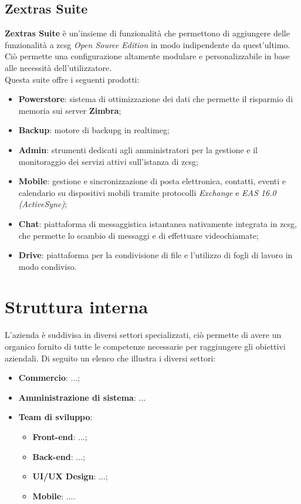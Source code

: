     \subsection{Zextras Suite}
        \textbf{Zextras Suite} è un'insieme di funzionalità che permettono di aggiungere delle funzionalità a \gls{zcsg} \textit{Open Source Edition} in modo indipendente da quest'ultimo. Ciò permette una configurazione altamente modulare e personalizzabile in base alle necessità dell'utilizzatore. \\
        Questa suite offre i seguenti prodotti:
        \begin{itemize}
            \setlength\itemsep{0em}
            \item \textbf{Powerstore}: sistema di ottimizzazione dei dati che permette il risparmio di memoria sui server \textbf{Zimbra};
            \item \textbf{Backup}: motore di \gls{backupg} in \gls{realtimeg};
            \item \textbf{Admin}: strumenti dedicati agli amministratori per la gestione e il monitoraggio dei servizi attivi sull'istanza di \gls{zcsg};
            \item \textbf{Mobile}: gestione e sincronizzazione di posta elettronica, contatti, eventi e calendario su dispositivi mobili tramite protocolli \textit{Exchange} e \textit{EAS 16.0 (ActiveSync)};
            \item \textbf{Chat}: piattaforma di messaggistica istantanea nativamente integrata in \gls{zcsg}, che permette lo scambio di messaggi e di effettuare videochiamate;
            \item \textbf{Drive}: piattaforma per la condivisione di file e l'utilizzo di fogli di lavoro in modo condiviso.
        \end{itemize}
\section{Struttura interna}
L'azienda è suddivisa in diversi settori specializzati, ciò permette di avere un organico fornito di tutte le competenze necessarie per raggiungere gli obiettivi aziendali. Di seguito un elenco che illustra i diversi settori:
\begin{itemize}
    \item \textbf{Commercio}: ...;
    \item \textbf{Amministrazione di sistema}: ...
    \item \textbf{Team di sviluppo}:
        \begin{itemize}
            \item \textbf{Front-end}: ...;
            \item \textbf{Back-end}: ...;
            \item \textbf{UI/UX Design}: ...;
            \item \textbf{Mobile}: ....
        \end{itemize}
\end{itemize}

